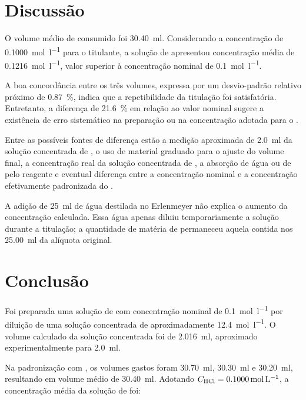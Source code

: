 \documentclass[a4paper,12pt]{article}
\newcommand{\ConcHCl}{0.1000}
\begin{document}
\section{Discussão}

O volume médio de  consumido foi
\qty{30.40}{\milli\litre}. Considerando a concentração de
\qty{\ConcHCl}{\mole\per\litre} para o titulante, a solução de 
apresentou concentração média de \qty{0.1216}{\mole\per\litre}, valor
superior à concentração nominal de \qty{0.1}{\mole\per\litre}.

A boa concordância entre os três volumes, expressa por um desvio-padrão
relativo próximo de \qty{0.87}{\percent}, indica que a repetibilidade da
titulação foi satisfatória. Entretanto, a diferença de
\qty{21.6}{\percent} em relação ao valor nominal sugere a existência de
erro sistemático na preparação ou na concentração adotada para o
.

Entre as possíveis fontes de diferença estão a medição aproximada de
\qty{2.0}{\milli\litre} da solução concentrada de , o uso de
material graduado para o ajuste do volume final, a concentração real da
solução concentrada de , a absorção de água ou de
 pelo reagente e eventual diferença entre a concentração nominal
e a concentração efetivamente padronizada do .

A adição de \qty{25}{\milli\litre} de água destilada no Erlenmeyer não
explica o aumento da concentração calculada. Essa água apenas diluiu
temporariamente a solução durante a titulação; a quantidade de matéria de
 permaneceu aquela contida nos
\qty{25.00}{\milli\litre} da alíquota original.

\section{Conclusão}

Foi preparada uma solução de  com concentração nominal de
\qty{0.1}{\mole\per\litre} por diluição de uma solução concentrada de
aproximadamente \qty{12.4}{\mole\per\litre}. O volume calculado da solução
concentrada foi de \qty{2.016}{\milli\litre}, aproximado
experimentalmente para \qty{2.0}{\milli\litre}.

Na padronização com , os volumes gastos foram
\qty{30.70}{\milli\litre}, \qty{30.30}{\milli\litre} e
\qty{30.20}{\milli\litre}, resultando em volume médio de
\qty{30.40}{\milli\litre}. Adotando
$C_{\ce{HCl}}=\qty{\ConcHCl}{\mole\per\litre}$, a concentração média da
solução de  foi:
\end{document}
